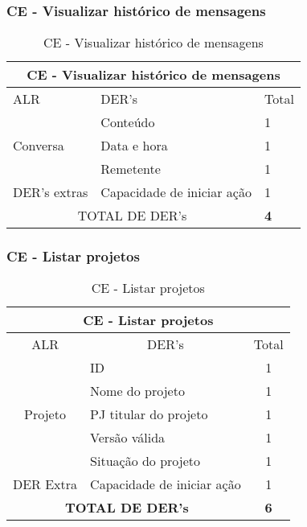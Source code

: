 \subsubsection{CE - Visualizar histórico de mensagens}
\begin{table}[!h]
\centering
\caption{CE - Visualizar histórico de mensagens}
\label{ee_enviar_mensagens}
\begin{tabular}{|l|l|l|}
\hline
\multicolumn{3}{|c|}{CE - Visualizar histórico de mensagens}                 \\ \hline
ALR                           & DER's                         & Total \\ \hline
\multirow{3}{*}{Conversa}     & Conteúdo                      & 1     \\ \cline{2-3} 
                              & Data e hora                   & 1     \\ \cline{2-3} 
                              & Remetente                     & 1     \\ \cline{2-3} \hline
DER's extras & Capacidade de iniciar ação    & 1     \\ \hline
\multicolumn{2}{|c|}{TOTAL DE DER's}                          & \textbf{4}    \\ \hline
\end{tabular}
\end{table}
 

 
  \subsubsection{CE - Listar projetos}

\begin{table}[!h]
\centering
\caption{CE - Listar projetos}
\label{ce_listar_projeto}
\begin{tabular}{|c|l|c|}
\hline
\multicolumn{3}{|c|}{CE - Listar projetos}                    \\ \hline
ALR                      & \multicolumn{1}{c|}{DER's} & Total \\ \hline
\multirow{5}{*}{Projeto} & ID                         & 1     \\ \cline{2-3} 
                         & Nome do projeto            & 1     \\ \cline{2-3} 
                         & PJ titular do projeto      & 1     \\ \cline{2-3} 
                         & Versão válida              & 1     \\ \cline{2-3} 
                         & Situação do projeto        & 1     \\ \hline
DER Extra                & Capacidade de iniciar ação & 1     \\ \hline
\multicolumn{2}{|c|}{\textbf{TOTAL DE DER's}}                  & \textbf{6}     \\ \hline
\end{tabular}
\end{table}



